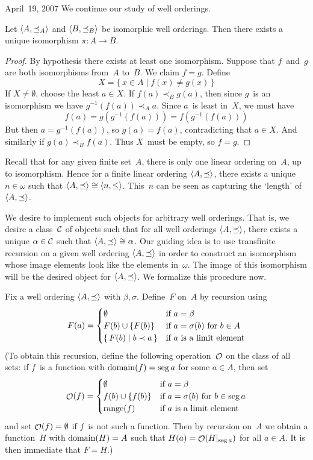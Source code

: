 \begin{lecture}{April~19, 2007}
We continue our study of well orderings.
\begin{thm}
Let \(\langle{A},{\preceq_A}\rangle\) and \(\langle{B},{\preceq_B}\rangle\) be isomorphic well orderings. Then there exists a unique isomorphism \(\pi:A\to B\).
\end{thm}
\begin{proof}
By hypothesis there exists at least one isomorphism. Suppose that \(f\)~and~\(g\) are both isomorphisms from~\(A\) to~\(B\). We claim \(f=g\). Define
\[X=\{\,x\in A\mid f(x)\ne g(x)\,\}\]
If \(X\ne\emptyset\), choose the least \(a\in X\). If \(f(a)\prec_B g(a)\), then since \(g\)~is an isomorphism we have \(g^{-1}(f(a))\prec_A a\). Since \(a\)~is least in~\(X\), we must have
\[f(a)=g(g^{-1}(f(a)))=f(g^{-1}(f(a)))\]
But then \(a=g^{-1}(f(a))\), so \(g(a)=f(a)\), contradicting that \(a\in X\). And similarly if \(g(a)\prec_B f(a)\). Thus \(X\)~must be empty, so \(f=g\).
\end{proof}

Recall that for any given finite set~\(A\), there is only one linear ordering on~\(A\), up to isomorphism. Hence for a finite linear ordering \(\langle{A},{\preceq}\rangle\), there exists a unique \(n\in\omega\) such that \(\langle{A},{\preceq}\rangle\cong\langle{n},{\le}\rangle\). This~\(n\) can be seen as capturing the `length' of \(\langle{A},{\preceq}\rangle\).

We desire to implement such objects for arbitrary well orderings. That is, we desire a class~\(\mathcal{C}\) of objects such that for all well orderings \(\langle{A},{\preceq}\rangle\), there exists a unique \(\alpha\in\mathcal{C}\) such that \(\langle{A},{\preceq}\rangle\cong\alpha\). Our guiding idea is to use transfinite recursion on a given well ordering \(\langle{A},{\preceq}\rangle\) in order to construct an isomorphism whose image elements look like the elements in~\(\omega\). The image of this isomorphism will be the desired object for \(\langle{A},{\preceq}\rangle\). We formalize this procedure now.

Fix a well ordering \(\langle{A},{\preceq}\rangle\) with \(\beta,\sigma\). Define~\(F\) on~\(A\) by recursion using
\[F(a)=
\begin{cases}
\emptyset&\text{if }a=\beta\\
F(b)\cup\{F(b)\}&\text{if }a=\sigma(b)\text{ for }b\in A\\
\{\,F(b)\mid b\prec a\,\}&\text{if }a\text{ is a limit element}
\end{cases}\]
(To obtain this recursion, define the following operation~\(\mathop{\mathcal{O}}\nolimits\) on the class of all sets: if \(f\)~is a function with \(\operatorname{domain}(f)=\operatorname{seg} a\) for some \(a\in A\), then set
\[\mathop{\mathcal{O}}\nolimits(f)=
\begin{cases}
\emptyset&\text{if }a=\beta\\
f(b)\cup\{f(b)\}&\text{if }a=\sigma(b)\text{ for }b\in\operatorname{seg} a\\
\operatorname{range}(f)&\text{if }a\text{ is a limit element}
\end{cases}\]
and set \(\mathop{\mathcal{O}}\nolimits(f)=\emptyset\) if \(f\)~is not such a function. Then by recursion on~\(A\) we obtain a function~\(H\) with \(\operatorname{domain}(H)=A\) such that \(H(a)=\mathop{\mathcal{O}}\nolimits(H|_{\operatorname{seg} a})\) for all \(a\in A\). It is then immediate that \(F=H\).)


\end{lecture}
